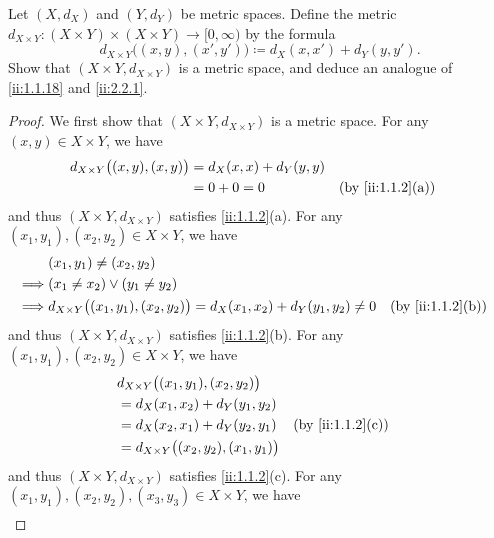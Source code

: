 \begin{ex}\label{ii:ex:2.2.8}
  Let \((X, d_X)\) and \((Y, d_Y)\) be metric spaces.
  Define the metric \(d_{X \times Y} : (X \times Y) \times (X \times Y) \to [0, \infty)\) by the formula
  \[
    d_{X \times Y}\big((x, y), (x', y')\big) \coloneqq d_X(x, x') + d_Y(y, y').
  \]
  Show that \((X \times Y, d_{X \times Y})\) is a metric space, and deduce an analogue of \cref{ii:1.1.18} and \cref{ii:2.2.1}.
\end{ex}

\begin{proof}
  We first show that \((X \times Y, d_{X \times Y})\) is a metric space.
  For any \((x, y) \in X \times Y\), we have
  \begin{align*}
    d_{X \times Y}\big((x, y), (x, y)\big) & = d_X(x, x) + d_Y(y, y)                    \\
                                           & = 0 + 0 = 0             &  & \by{ii:1.1.2}[a]
  \end{align*}
  and thus \((X \times Y, d_{X \times Y})\) satisfies \cref{ii:1.1.2}(a).
  For any \((x_1, y_1), (x_2, y_2) \in X \times Y\), we have
  \begin{align*}
             & (x_1, y_1) \neq (x_2, y_2)                                                                               \\
    \implies & (x_1 \neq x_2) \lor (y_1 \neq y_2)                                                                       \\
    \implies & d_{X \times Y}\big((x_1, y_1), (x_2, y_2)\big) = d_X(x_1, x_2) + d_Y(y_1, y_2) \neq 0 &  & \by{ii:1.1.2}[b]
  \end{align*}
  and thus \((X \times Y, d_{X \times Y})\) satisfies \cref{ii:1.1.2}(b).
  For any \((x_1, y_1), (x_2, y_2) \in X \times Y\), we have
  \begin{align*}
     & d_{X \times Y}\big((x_1, y_1), (x_2, y_2)\big)                      \\
     & = d_X(x_1, x_2) + d_Y(y_1, y_2)                                     \\
     & = d_X(x_2, x_1) + d_Y(y_2, y_1)                  &  & \by{ii:1.1.2}[c] \\
     & = d_{X \times Y}\big((x_2, y_2), (x_1, y_1)\big)
  \end{align*}
  and thus \((X \times Y, d_{X \times Y})\) satisfies \cref{ii:1.1.2}(c).
  For any \((x_1, y_1), (x_2, y_2), (x_3, y_3) \in X \times Y\), we have
  \begin{align*}

\end{align*}
\end{proof}
